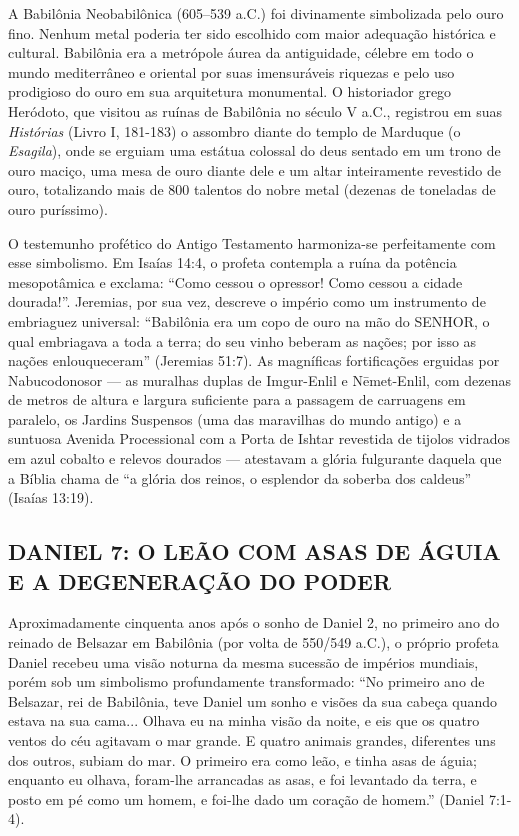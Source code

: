A Babilônia Neobabilônica (605–539 a.C.) foi divinamente simbolizada pelo ouro fino. Nenhum metal poderia ter sido escolhido com maior adequação histórica e cultural. Babilônia era a metrópole áurea da antiguidade, célebre em todo o mundo mediterrâneo e oriental por suas imensuráveis riquezas e pelo uso prodigioso do ouro em sua arquitetura monumental. O historiador grego Heródoto, que visitou as ruínas de Babilônia no século V a.C., registrou em suas \textit{Histórias} (Livro I, 181-183) o assombro diante do templo de Marduque (o \textit{Esagila}), onde se erguiam uma estátua colossal do deus sentado em um trono de ouro maciço, uma mesa de ouro diante dele e um altar inteiramente revestido de ouro, totalizando mais de 800 talentos do nobre metal (dezenas de toneladas de ouro puríssimo).

O testemunho profético do Antigo Testamento harmoniza-se perfeitamente com esse simbolismo. Em Isaías 14:4, o profeta contempla a ruína da potência mesopotâmica e exclama: ``Como cessou o opressor! Como cessou a cidade dourada!''. Jeremias, por sua vez, descreve o império como um instrumento de embriaguez universal: ``Babilônia era um copo de ouro na mão do SENHOR, o qual embriagava a toda a terra; do seu vinho beberam as nações; por isso as nações enlouqueceram'' (Jeremias 51:7). As magníficas fortificações erguidas por Nabucodonosor — as muralhas duplas de Imgur-Enlil e Nēmet-Enlil, com dezenas de metros de altura e largura suficiente para a passagem de carruagens em paralelo, os Jardins Suspensos (uma das maravilhas do mundo antigo) e a suntuosa Avenida Processional com a Porta de Ishtar revestida de tijolos vidrados em azul cobalto e relevos dourados — atestavam a glória fulgurante daquela que a Bíblia chama de ``a glória dos reinos, o esplendor da soberba dos caldeus'' (Isaías 13:19).



\subsection{DANIEL 7: O LEÃO COM ASAS DE ÁGUIA E A DEGENERAÇÃO DO PODER}


Aproximadamente cinquenta anos após o sonho de Daniel 2, no primeiro ano do reinado de Belsazar em Babilônia (por volta de 550/549 a.C.), o próprio profeta Daniel recebeu uma visão noturna da mesma sucessão de impérios mundiais, porém sob um simbolismo profundamente transformado:
``No primeiro ano de Belsazar, rei de Babilônia, teve Daniel um sonho e visões da sua cabeça quando estava na sua cama... Olhava eu na minha visão da noite, e eis que os quatro ventos do céu agitavam o mar grande. E quatro animais grandes, diferentes uns dos outros, subiam do mar. O primeiro era como leão, e tinha asas de águia; enquanto eu olhava, foram-lhe arrancadas as asas, e foi levantado da terra, e posto em pé como um homem, e foi-lhe dado um coração de homem.'' (Daniel 7:1-4).

